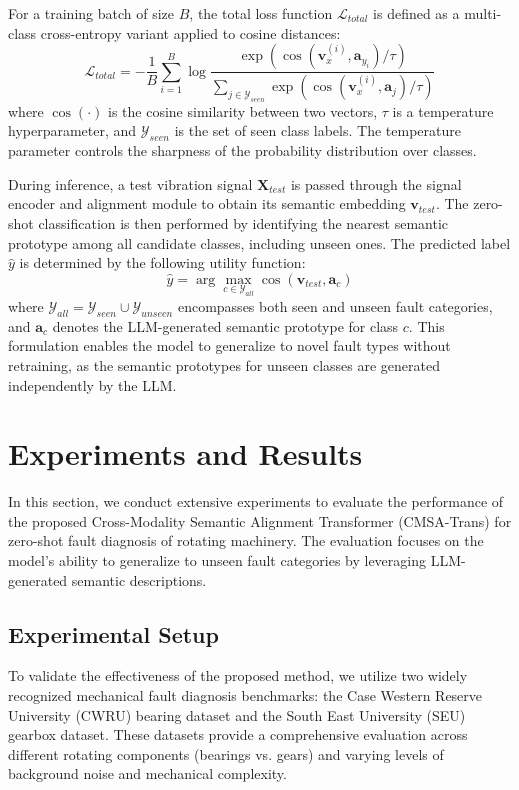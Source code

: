 \documentclass[journal]{IEEEtran}
\begin{document}
For a training batch of size $B$, the total loss function $\mathcal{L}_{total}$ is defined as a multi-class cross-entropy variant applied to cosine distances:
\begin{equation}
\mathcal{L}_{total} = -\frac{1}{B} \sum_{i=1}^{B} \log \frac{\exp(\cos(\mathbf{v}_x^{(i)}, \mathbf{a}_{y_i}) / \tau)}{\sum_{j \in \mathcal{Y}_{seen}} \exp(\cos(\mathbf{v}_x^{(i)}, \mathbf{a}_j) / \tau)}
\end{equation}
where $\cos(\cdot)$ is the cosine similarity between two vectors, $\tau$ is a temperature hyperparameter, and $\mathcal{Y}_{seen}$ is the set of seen class labels. The temperature parameter controls the sharpness of the probability distribution over classes.

During inference, a test vibration signal $\mathbf{X}_{test}$ is passed through the signal encoder and alignment module to obtain its semantic embedding $\mathbf{v}_{test}$. The zero-shot classification is then performed by identifying the nearest semantic prototype among all candidate classes, including unseen ones. The predicted label $\hat{y}$ is determined by the following utility function:
\begin{equation}
\hat{y} = \arg\max_{c \in \mathcal{Y}_{all}} \cos(\mathbf{v}_{test}, \mathbf{a}_c)
\end{equation}
where $\mathcal{Y}_{all} = \mathcal{Y}_{seen} \cup \mathcal{Y}_{unseen}$ encompasses both seen and unseen fault categories, and $\mathbf{a}_c$ denotes the LLM-generated semantic prototype for class $c$. This formulation enables the model to generalize to novel fault types without retraining, as the semantic prototypes for unseen classes are generated independently by the LLM.


\section{Experiments and Results}
In this section, we conduct extensive experiments to evaluate the performance of the proposed Cross-Modality Semantic Alignment Transformer (CMSA-Trans) for zero-shot fault diagnosis of rotating machinery. The evaluation focuses on the model's ability to generalize to unseen fault categories by leveraging LLM-generated semantic descriptions.

\subsection{Experimental Setup}
To validate the effectiveness of the proposed method, we utilize two widely recognized mechanical fault diagnosis benchmarks: the Case Western Reserve University (CWRU) bearing dataset and the South East University (SEU) gearbox dataset. These datasets provide a comprehensive evaluation across different rotating components (bearings vs. gears) and varying levels of background noise and mechanical complexity.
\end{document}
